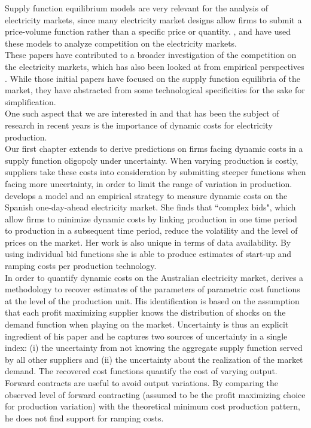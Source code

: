 Supply function equilibrium models are very relevant for the analysis of electricity markets, since many electricity market designs allow firms to submit a price-volume function rather than a specific price or quantity. \cite{Newgreen}, \cite{newbery1998competition} and \cite{bolle1992supply} have used these models to analyze competition on the electricity markets. \\

These papers have contributed to a broader investigation of the competition on the electricity markets, which has also been looked at from empirical perspectives \cite{wolfram1998strategic, borensteinetal2002marketineffs}.
While those initial papers have focused on the supply function equilibria of the market, they have abstracted from some technological specificities for the sake for simplification. \\

One such aspect that we are interested in and that has been the subject of research in recent years is the importance of dynamic costs for electricity production. \\

Our first chapter extends \cite{KM} to derive predictions on firms facing dynamic costs in a supply function oligopoly under uncertainty. When varying production is costly, suppliers take these costs into consideration by submitting steeper functions when facing more uncertainty, in order to limit the range of variation in production. \cite{reguant2011welfare} develops a model and an empirical strategy to measure dynamic costs on the Spanish one-day-ahead electricity market. She finds that ``complex bids", which allow firms to minimize dynamic costs by linking production in one time period to production in a subsequent time period, reduce the volatility and the level of prices on the market. Her work is also unique in terms of data availability. By using individual bid functions she is able to produce estimates of start-up and ramping costs per production technology. \\

In order to quantify dynamic costs on the Australian electricity market, \cite{wolak2007quantifying} derives a methodology to recover estimates of the parameters of parametric cost functions at the level of the production unit. His identification is based on the assumption that each profit maximizing supplier knows the distribution of shocks on the demand function when playing on the market. Uncertainty is thus an explicit ingredient of his paper and he captures two sources of uncertainty in a single index: (i) the uncertainty from not knowing the aggregate supply function served by all other suppliers and (ii) the uncertainty about the realization of the market demand. The recovered cost functions quantify the cost of varying output. Forward contracts are useful to avoid output variations. By comparing the observed level of forward contracting (assumed to be the profit maximizing choice for production variation) with the theoretical minimum cost production pattern, he does not find support for ramping costs.\\


